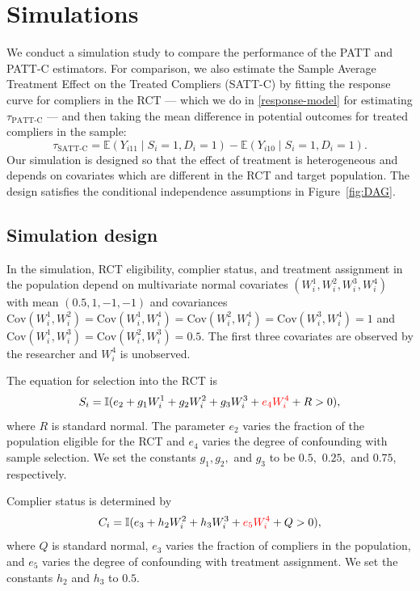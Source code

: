 \documentclass[hidelinks,12pt]{article}
\newcommand{\ind}{\mathbb{I}} %
\newcommand{\ex}{\mathbb{E}} %
\newcommand{\cov}{\mathrm{Cov}}
\begin{document}
{\section{Simulations} \label{sim}
\color{red}We conduct a simulation study to compare the performance of the PATT and PATT-C estimators. For comparison, we also estimate the Sample Average Treatment Effect on the Treated Compliers (SATT-C) by fitting the response curve for compliers in the RCT --- which we do in \ref{response-model} for estimating $\tau_{\text{PATT-C}}$ --- and then taking the mean difference in potential outcomes for treated compliers in the sample:
\begin{equation}\label{tsatt-est} 
\tau_{\text{SATT-C}} = \ex(Y_{i11} \mid S_i=1, D_i=1) - \ex(Y_{i10} \mid S_i=1, D_i=1).
\end{equation}
\color{black}
Our simulation is designed so that the effect of treatment is heterogeneous and depends on covariates which are different in the RCT and target population. The design satisfies the conditional independence assumptions in Figure~\ref{fig:DAG}.

\subsection{Simulation design}
{\color{red}In the simulation, RCT eligibility, complier status, and treatment assignment in the population depend on multivariate normal covariates $(W^{1}_i, W^{2}_i, W^{3}_i, W^{4}_i)$ with mean $(0.5, 1, -1, -1)$ and covariances $\cov(W^{1}_i, W^{2}_i) = \cov(W^{1}_i, W^{4}_i)= \cov(W^{2}_i, W^{4}_i) = \cov(W^{3}_i, W^{4}_i) = 1$ and $\cov(W^{1}_i, W^{3}_i) = \cov(W^{2}_i, W^{3}_i) = 0.5$.  The first three covariates are observed by the researcher and $W^{4}_i$ is unobserved. }

The  equation for selection into the RCT is
 \vskip 0.2in
 $$ S_i = \ind(e_2 + g_1W^{1}_i + g_2W^{2}_i + g_3W^{3}_i + {\color{red}e_4W^{4}_i} + R > 0),$$
 \vskip 0.2in
\noindent
where $R$ is standard normal. The parameter $e_2$ varies the fraction of the population eligible for the RCT and {\color{red}$e_4$ varies the degree of confounding with sample selection.} We set the constants $g_1, g_2,$ and $g_3$ to be $0.5,$ $0.25,$ and $0.75$, respectively.

Complier status is determined by
\vskip 0.2in
$$C_i = \ind(e_3 + h_2W^{2}_i + h_3W^{3}_i + {\color{red}e_5W^{4}_i} + Q > 0),$$
\vskip 0.2in
\noindent
where $Q$ is standard normal, $e_3$ varies the fraction of compliers in the population, and {\color{red}$e_5$ varies the degree of confounding with treatment assignment.} We set the constants $h_2$ and $h_3$ to $0.5$.

}
\end{document}
